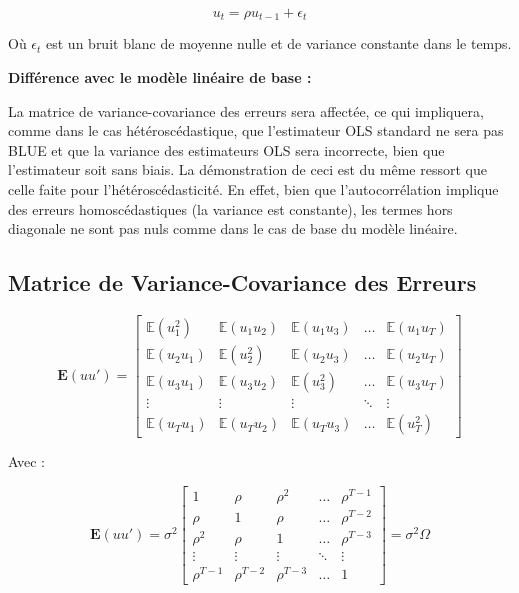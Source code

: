 \documentclass[14pt]{extarticle} %
\theoremstyle{definition}
\theoremstyle{plain}
\begin{document}
\begin{equation}
u_t = \rho u_{t-1} + \epsilon_t
\end{equation}

Où $\epsilon_t$ est un bruit blanc de moyenne nulle et de variance constante dans le temps.

\textbf{Différence avec le modèle linéaire de base :}

La matrice de variance-covariance des erreurs sera affectée, ce qui impliquera, comme dans le cas hétéroscédastique, que l’estimateur OLS standard ne sera pas BLUE et que la variance des estimateurs OLS sera incorrecte, bien que l’estimateur soit sans biais. La démonstration de ceci est du même ressort que celle faite pour l’hétéroscédasticité. En effet, bien que l’autocorrélation implique des erreurs homoscédastiques (la variance est constante), les termes hors diagonale ne sont pas nuls comme dans le cas de base du modèle linéaire.

\subsection{Matrice de Variance-Covariance des Erreurs}

\[
\mathbf{E}(uu') = 
\begin{bmatrix}
\mathbb{E}(u_1^2) & \mathbb{E}(u_1 u_2) & \mathbb{E}(u_1 u_3) & \dots & \mathbb{E}(u_1 u_T) \\
\mathbb{E}(u_2 u_1) & \mathbb{E}(u_2^2) & \mathbb{E}(u_2 u_3) & \dots & \mathbb{E}(u_2 u_T) \\
\mathbb{E}(u_3 u_1) & \mathbb{E}(u_3 u_2) & \mathbb{E}(u_3^2) & \dots & \mathbb{E}(u_3 u_T) \\
\vdots & \vdots & \vdots & \ddots & \vdots \\
\mathbb{E}(u_T u_1) & \mathbb{E}(u_T u_2) & \mathbb{E}(u_T u_3) & \dots & \mathbb{E}(u_T^2)
\end{bmatrix}
\]

Avec :

\[
\mathbf{E}(uu') = \sigma^2 
\begin{bmatrix}
1 & \rho & \rho^2 & \dots & \rho^{T-1} \\
\rho & 1 & \rho & \dots & \rho^{T-2} \\
\rho^2 & \rho & 1 & \dots & \rho^{T-3} \\
\vdots & \vdots & \vdots & \ddots & \vdots \\
\rho^{T-1} & \rho^{T-2} & \rho^{T-3} & \dots & 1
\end{bmatrix}
= \sigma^2 \Omega
\]
\end{document}
